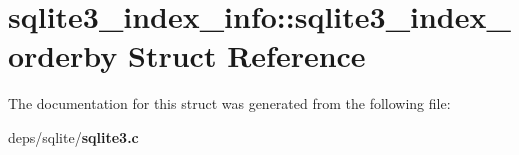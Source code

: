 \section{sqlite3\_\-index\_\-info::sqlite3\_\-index\_\-orderby Struct Reference}
\label{structsqlite3__index__info_1_1sqlite3__index__orderby}


The documentation for this struct was generated from the following file:\begin{CompactItemize}
\item 
deps/sqlite/\bf{sqlite3.c}\end{CompactItemize}
